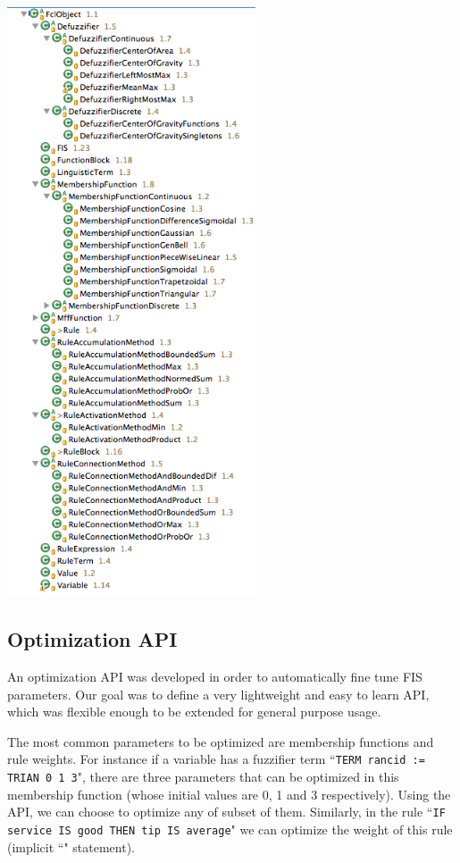 \documentclass[11pt,twoside]{article}
\begin{document}
\begin{multicols}{2}
\vspace*{10pt}
\centerline{\includegraphics[width=2.9in]{./figs/jFuzzy_object_tree.png}}
\vspace*{10pt}
\label{f:acumulation}
\vspace*{10pt}

\subsection{Optimization API \label{sec:optim}}

An optimization API was developed in order to automatically fine tune FIS parameters.
Our goal was to define a very lightweight and easy to learn API, which was flexible enough to be extended for general purpose usage.

The most common parameters to be optimized are membership functions and rule weights.
For instance if a variable has a fuzzifier term ``\texttt{TERM rancid := TRIAN 0 1 3}", there are three parameters that can be optimized in this membership function (whose initial values are 0, 1 and 3 respectively). 
Using the API, we can choose to optimize any of subset of them.
Similarly, in the rule ``\texttt{IF service IS good THEN tip IS average}" we can optimize the weight of this rule (implicit ``" statement).


\end{multicols}
\end{document}
